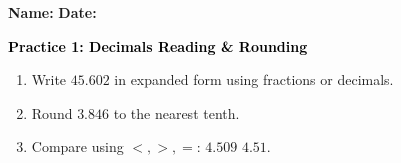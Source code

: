\documentclass[12pt, letterpaper, fleqn]{article}
\newcommand{\blank}{\underline{\hspace{2.2cm}}}
\begin{document}
\textbf{Name:} \underline{\hspace{5cm}}
\hfill
\textbf{Date:} \underline{\hspace{3cm}}\\

\begin{tcolorbox}[colback=customteal!20]
    \large\textcolor{black}{\textbf{Practice 1: Decimals Reading \& Rounding}}
\end{tcolorbox}
\begin{enumerate}[itemsep=3.5cm, leftmargin=0.6cm]
\item Write $45.602$ in expanded form using fractions or decimals.
\vspace{3.5cm}
\item Round $3.846$ to the nearest tenth.
\vspace{3.5cm}
\item Compare using $<, >, =$: $4.509$ \blank $4.51$.
\end{enumerate}
\end{document}
